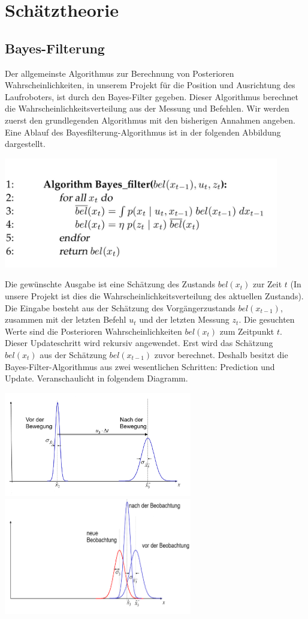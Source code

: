 \section{Schätztheorie}

\subsection{Bayes-Filterung}
Der allgemeinste Algorithmus zur Berechnung von Posterioren Wahrscheinlichkeiten, in unserem Projekt für die Position und Ausrichtung des Laufroboters, ist durch den Bayes-Filter gegeben.
 Dieser Algorithmus berechnet die Wahrscheinlichkeitsverteilung aus der Messung und Befehlen. Wir werden zuerst den grundlegenden Algorithmus mit den bisherigen Annahmen angeben. Eine Ablauf des Bayesfilterung-Algorithmus ist in der folgenden Abbildung dargestellt.

{\centering
 \includegraphics[width=12cm]{Images/image_6483441.jpg}}

Die gewünschte Ausgabe ist eine Schätzung des Zustands $bel(x_{t})$ zur Zeit $t$ (In unsere Projekt ist dies die Wahrscheinlichkeitsverteilung des aktuellen Zustands). Die Eingabe besteht aus der Schätzung des Vorgängerzustands $bel(x_{t-1})$, zusammen mit der letzten Befehl $u_{t}$ und der letzten Messung $z_{t}$. Die gesuchten Werte sind die Posterioren Wahrscheinlichkeiten $bel(x_{t})$ zum Zeitpunkt $t$. Dieser Updateschritt wird rekursiv angewendet. Erst wird das Schätzung $bel(x_{t})$ aus der Schätzung $bel(x_{t-1})$ zuvor berechnet. Deshalb besitzt die Bayes-Filter-Algorithmus aus zwei wesentlichen Schritten: Prediction und Update. Veranschaulicht in folgendem Diagramm.

{\centering
\includegraphics[width=8.2cm]{Images/prediction.png}}
{\centering
\includegraphics[width=8.2cm]{Images/update.png}}


